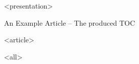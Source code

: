 \mode
<presentation>

\begin{frame}{An Example Article -- The produced TOC}
  \label{example:art:tex:toc}

  \begin{example}
    }
  \end{example}
\end{frame}

\mode
<article>

\bigskip

\mode
<all>
